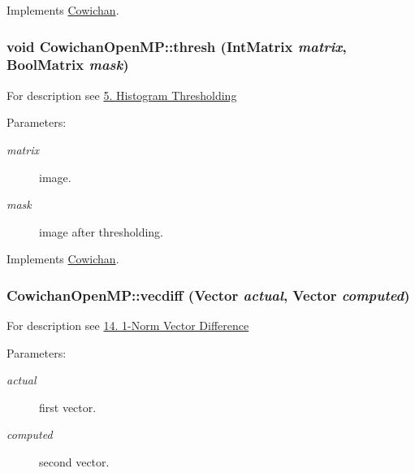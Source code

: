 Implements \hyperlink{class_cowichan_92d8d9ae77208115fdfe69e1174f601c}{Cowichan}.\hypertarget{class_cowichan_open_m_p_e72c4c0a162f30eac37333bd28db97bc}{
\subsubsection[{thresh}]{\setlength{\rightskip}{0pt plus 5cm}void CowichanOpenMP::thresh ({\bf IntMatrix} {\em matrix}, \/  {\bf BoolMatrix} {\em mask})}}
\label{class_cowichan_open_m_p_e72c4c0a162f30eac37333bd28db97bc}


For description see \hyperlink{index_thresh_sec}{5. Histogram Thresholding} \begin{Desc}
\item[Parameters:]
\begin{description}
\item[{\em matrix}]image. \item[{\em mask}]image after thresholding. \end{description}
\end{Desc}


Implements \hyperlink{class_cowichan_a0b633b8c1f21884e0998a9c7020c08c}{Cowichan}.\hypertarget{class_cowichan_open_m_p_92aa23ed47da0a5a3b43416ab08199b3}{
\subsubsection[{vecdiff}]{ CowichanOpenMP::vecdiff ({\bf Vector} {\em actual}, \/  {\bf Vector} {\em computed})}}
\label{class_cowichan_open_m_p_92aa23ed47da0a5a3b43416ab08199b3}


For description see \hyperlink{index_vecdiff_sec}{14. 1-Norm Vector Difference} \begin{Desc}
\item[Parameters:]
\begin{description}
\item[{\em actual}]first vector. \item[{\em computed}]second vector. \end{description}
\end{Desc}


